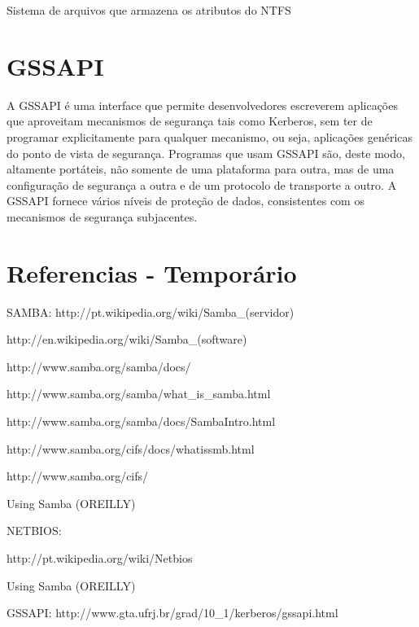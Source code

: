 Sistema de arquivos que armazena os atributos do NTFS

\section{GSSAPI}

A GSSAPI é uma interface que permite desenvolvedores escreverem aplicações que aproveitam mecanismos de segurança tais como Kerberos, sem ter de programar explicitamente para qualquer mecanismo, ou seja, aplicações genéricas do ponto de vista de segurança. Programas que usam GSSAPI são, deste modo, altamente portáteis, não somente de uma plataforma para outra, mas de uma configuração de segurança a outra e de um protocolo de transporte a outro. A GSSAPI fornece vários níveis de proteção de dados, consistentes com os mecanismos de segurança subjacentes.


\section{Referencias - Temporário}
SAMBA:
http://pt.wikipedia.org/wiki/Samba\_(servidor)

http://en.wikipedia.org/wiki/Samba\_(software)

http://www.samba.org/samba/docs/

http://www.samba.org/samba/what\_is\_samba.html

http://www.samba.org/samba/docs/SambaIntro.html

http://www.samba.org/cifs/docs/what\-is\-smb.html

http://www.samba.org/cifs/

Using Samba (OREILLY)

NETBIOS:

http://pt.wikipedia.org/wiki/Netbios

Using Samba (OREILLY)

GSSAPI:
http://www.gta.ufrj.br/grad/10\_1/kerberos/gssapi.html